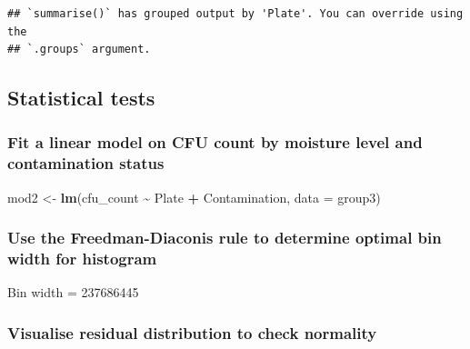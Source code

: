 \documentclass[
]{article}
\newenvironment{Shaded}{\begin{snugshade}}{\end{snugshade}}
\newcommand{\AttributeTok}[1]{\textcolor[rgb]{0.13,0.29,0.53}{#1}}
\newcommand{\DecValTok}[1]{\textcolor[rgb]{0.00,0.00,0.81}{#1}}
\newcommand{\FunctionTok}[1]{\textcolor[rgb]{0.13,0.29,0.53}{\textbf{#1}}}
\newcommand{\NormalTok}[1]{#1}
\newcommand{\OtherTok}[1]{\textcolor[rgb]{0.56,0.35,0.01}{#1}}
\newcommand{\SpecialCharTok}[1]{\textcolor[rgb]{0.81,0.36,0.00}{\textbf{#1}}}
\begin{document}
\begin{verbatim}
## `summarise()` has grouped output by 'Plate'. You can override using the
## `.groups` argument.
\end{verbatim}

\subsection{Statistical tests}\label{statistical-tests-1}

\subsubsection{Fit a linear model on CFU count by moisture level and
contamination
status}\label{fit-a-linear-model-on-cfu-count-by-moisture-level-and-contamination-status-1}

\begin{Shaded}
\begin{Highlighting}[]
\NormalTok{mod2 }\OtherTok{\textless{}{-}} \FunctionTok{lm}\NormalTok{(cfu\_count }\SpecialCharTok{\textasciitilde{}}\NormalTok{ Plate }\SpecialCharTok{+}\NormalTok{ Contamination, }\AttributeTok{data =}\NormalTok{ group3)}
\end{Highlighting}
\end{Shaded}

\subsubsection{Use the Freedman-Diaconis rule to determine optimal bin
width for
histogram}\label{use-the-freedman-diaconis-rule-to-determine-optimal-bin-width-for-histogram}

\begin{Shaded}
\end{Shaded}

Bin width = 237686445

\subsubsection{Visualise residual distribution to check
normality}\label{visualise-residual-distribution-to-check-normality-1}
\end{document}
